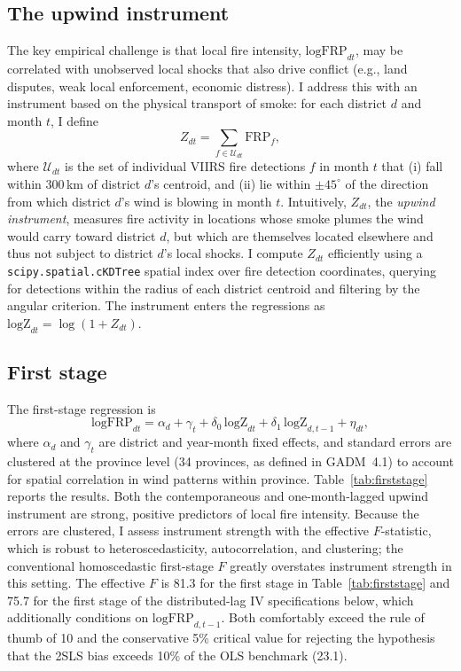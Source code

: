 \documentclass[12pt]{article}
\begin{document}
\subsection{The upwind instrument}

The key empirical challenge is that local fire intensity, $\text{logFRP}_{dt}$, may be correlated with unobserved local shocks that also drive conflict (e.g., land disputes, weak local enforcement, economic distress). I address this with an instrument based on the physical transport of smoke: for each district $d$ and month $t$, I define
\[
Z_{dt} = \sum_{f \in \mathcal{U}_{dt}} \text{FRP}_f,
\]
where $\mathcal{U}_{dt}$ is the set of individual VIIRS fire detections $f$ in month $t$ that (i) fall within 300\,km of district $d$'s centroid, and (ii) lie within $\pm 45^{\circ}$ of the direction from which district $d$'s wind is blowing in month $t$. Intuitively, $Z_{dt}$, the \emph{upwind instrument}, measures fire activity in locations whose smoke plumes the wind would carry toward district $d$, but which are themselves located elsewhere and thus not subject to district $d$'s local shocks. I compute $Z_{dt}$ efficiently using a \texttt{scipy.spatial.cKDTree} spatial index over fire detection coordinates, querying for detections within the radius of each district centroid and filtering by the angular criterion. The instrument enters the regressions as $\text{logZ}_{dt} = \log(1+Z_{dt})$.

\subsection{First stage}

The first-stage regression is
\begin{equation}
\text{logFRP}_{dt} = \alpha_d + \gamma_t + \delta_0\, \text{logZ}_{dt} + \delta_1\, \text{logZ}_{d,t-1} + \eta_{dt},
\label{eq:firststage}
\end{equation}
where $\alpha_d$ and $\gamma_t$ are district and year-month fixed effects, and standard errors are clustered at the province level (34 provinces, as defined in GADM~4.1) to account for spatial correlation in wind patterns within province. Table~\ref{tab:firststage} reports the results. Both the contemporaneous and one-month-lagged upwind instrument are strong, positive predictors of local fire intensity. Because the errors are clustered, I assess instrument strength with the \citet{montielolea2013} effective $F$-statistic, which is robust to heteroscedasticity, autocorrelation, and clustering; the conventional homoscedastic first-stage $F$ greatly overstates instrument strength in this setting. The effective $F$ is 81.3 for the first stage in Table~\ref{tab:firststage} and 75.7 for the first stage of the distributed-lag IV specifications below, which additionally conditions on $\text{logFRP}_{d,t-1}$. Both comfortably exceed the \citet{staigerstock1997} rule of thumb of 10 and the conservative \citet{montielolea2013} 5\% critical value for rejecting the hypothesis that the 2SLS bias exceeds 10\% of the OLS benchmark (23.1).
\end{document}
